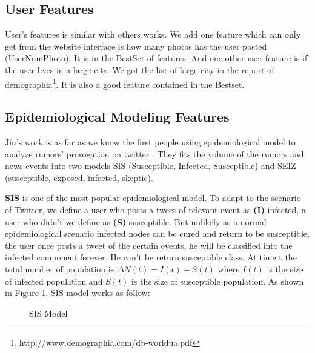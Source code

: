\subsection{User Features}
User's features is similar with others works. We add one feature which can only get from the website interface is how many photos has the user posted (UserNumPhoto). It is in the BestSet of features. And one other user feature is if the user lives in a large city. We got the list of large city in the report of demographia\footnote{http://www.demographia.com/db-worldua.pdf}. It is also a good feature contained in the Bestset.
\subsection{Epidemiological Modeling Features}
\label{sec:epide}
Jin's work is as far as we know the first people using epidemiological model to analyze rumors' prorogation on twitter \cite{jin2013epidemiological}. They fits the volume of the rumors and news events into two models SIS (Susceptible, Infected, Susceptible) and SEIZ (susceptible, exposed, infected, skeptic). 

\textbf{SIS} is one of the most popular epidemiological model. To adapt to the scenario of Twitter, we define a user who posts a tweet of relevant event as \textbf{(I)} infected, a user who didn't we define as \textbf{(S)} susceptible. But unlikely as a normal epidemiological scenario infected nodes can be cured and return to be susceptible,  the user once posts a tweet of the certain events, he will be classified into the infected component forever. He can't be return susceptible class. At time t the total number of population is $\Delta N(t)= I(t) + S(t)$ where $I(t)$ is the size of infected population and  $S(t)$ is the size of susceptible population.  As shown in Figure \ref{fig:SIS}, SIS model works as follow:

\begin{figure}[!h]
\center
\def\layersep{2.5cm}
   \caption{SIS Model}
\label{fig:SIS}
\end{figure}
	
